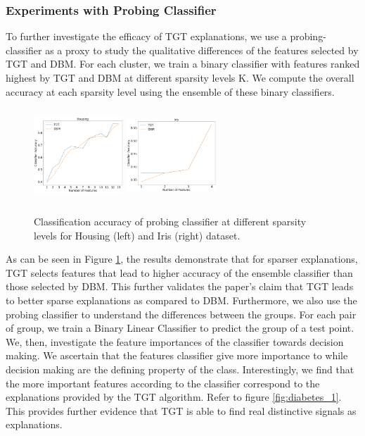 \subsubsection{Experiments with Probing Classifier}
To further investigate the efficacy of TGT explanations, we use a probing-classifier \cite{belinkov-etal-2020-interpretability} as a proxy to study the qualitative differences of the features selected by TGT and DBM. For each cluster, we train a binary classifier with features ranked highest by TGT and DBM at different sparsity levels K. We compute the overall accuracy at each sparsity level using the ensemble of these binary classifiers.
\begin{figure}
\centering
    \includegraphics[width=0.3\textwidth, height=3.5cm]{images/tffigures/housing-classification-2.png}
    \includegraphics[width=0.3\textwidth, height=3.5cm]{images/tffigures/iris-classification-2.png}
    \caption{Classification accuracy of probing classifier at different sparsity levels for Housing (left) and Iris (right) dataset.}
    \label{fig:classification}
\end{figure}
As can be seen in Figure \ref{fig:classification}, the results demonstrate that for sparser explanations, TGT selects features that lead to higher accuracy of the ensemble classifier than those selected by DBM. This further validates the paper’s claim that TGT leads to better sparse explanations as compared to DBM.
Furthermore, we also use the probing classifier to understand the differences between the groups. For each pair of group, we train a Binary Linear Classifier to predict the group of a test point. We, then, investigate the feature importances of the classifier towards decision making. We ascertain that the features classifier give more importance to while decision making are the defining property of the class. Interestingly, we find that the more important features according to the classifier correspond to the explanations provided by the TGT algorithm. Refer to figure \ref{fig:diabetes_1}. This provides further evidence that TGT is able to find real distinctive signals as explanations.



